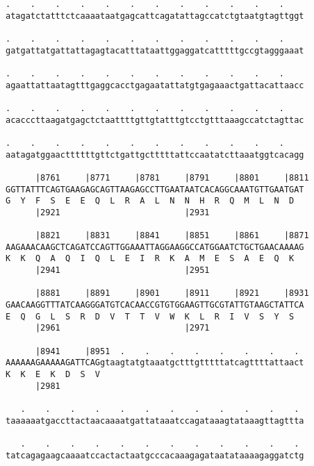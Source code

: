 \documentclass{article}
\begin{document}
\begin{Verbatim}
.    .    .    .    .    .    .    .    .    .    .    .    
atagatctatttctcaaaataatgagcattcagatattagccatctgtaatgtagttggt
                                                            
.    .    .    .    .    .    .    .    .    .    .    .    
gatgattatgattattagagtacatttataattggaggatcatttttgccgtagggaaat
                                                            
.    .    .    .    .    .    .    .    .    .    .    .    
agaattattaatagtttgaggcacctgagaatattatgtgagaaactgattacattaacc
                                                            
.    .    .    .    .    .    .    .    .    .    .    .    
acacccttaagatgagctctaattttgttgtatttgtcctgtttaaagccatctagttac
                                                            
.    .    .    .    .    .    .    .    .    .    .    .    
aatagatggaacttttttgttctgattgctttttattccaatatcttaaatggtcacagg
                                                            
      |8761     |8771     |8781     |8791     |8801     |8811
GGTTATTTCAGTGAAGAGCAGTTAAGAGCCTTGAATAATCACAGGCAAATGTTGAATGAT
G  Y  F  S  E  E  Q  L  R  A  L  N  N  H  R  Q  M  L  N  D  
      |2921                         |2931                   
  
      |8821     |8831     |8841     |8851     |8861     |8871
AAGAAACAAGCTCAGATCCAGTTGGAAATTAGGAAGGCCATGGAATCTGCTGAACAAAAG
K  K  Q  A  Q  I  Q  L  E  I  R  K  A  M  E  S  A  E  Q  K  
      |2941                         |2951                   
  
      |8881     |8891     |8901     |8911     |8921     |8931
GAACAAGGTTTATCAAGGGATGTCACAACCGTGTGGAAGTTGCGTATTGTAAGCTATTCA
E  Q  G  L  S  R  D  V  T  T  V  W  K  L  R  I  V  S  Y  S  
      |2961                         |2971                   
  
      |8941     |8951  .    .    .    .    .    .    .    . 
AAAAAAGAAAAAGATTCAGgtaagtatgtaaatgctttgtttttatcagttttattaact
K  K  E  K  D  S  V                                         
      |2981                                                 
  
   .    .    .    .    .    .    .    .    .    .    .    . 
taaaaaatgaccttactaacaaaatgattataaatccagataaagtataaagttagttta
                                                            
   .    .    .    .    .    .    .    .    .    .    .    . 
tatcagagaagcaaaatccactactaatgcccacaaagagataatataaaagaggatctg
                                                            

\end{Verbatim}
\end{document}
